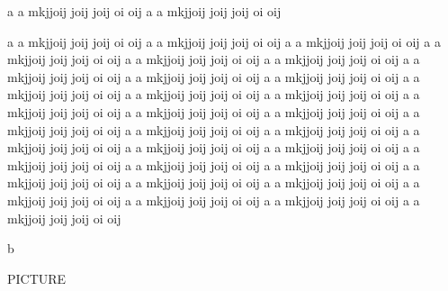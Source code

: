 \documentclass[12pt,twoside,twocolumn,draft,showtrims]{memoir} %
\begin{document}
\newpage
a a mkjjoij  joij joij oi  oij 
a a mkjjoij  joij joij oi  oij 

a a mkjjoij  joij joij oi  oij 
a a mkjjoij  joij joij oi  oij 
a a mkjjoij  joij joij oi  oij 
a a mkjjoij  joij joij oi  oij 
a a mkjjoij  joij joij oi  oij 
a a mkjjoij  joij joij oi  oij 
a a mkjjoij  joij joij oi  oij 
a a mkjjoij  joij joij oi  oij 
a a mkjjoij  joij joij oi  oij 
a a mkjjoij  joij joij oi  oij 
a a mkjjoij  joij joij oi  oij 
a a mkjjoij  joij joij oi  oij 
a a mkjjoij  joij joij oi  oij 
a a mkjjoij  joij joij oi  oij 
a a mkjjoij  joij joij oi  oij 
a a mkjjoij  joij joij oi  oij 
a a mkjjoij  joij joij oi  oij 
a a mkjjoij  joij joij oi  oij 
a a mkjjoij  joij joij oi  oij 
a a mkjjoij  joij joij oi  oij 
a a mkjjoij  joij joij oi  oij 
a a mkjjoij  joij joij oi  oij 
a a mkjjoij  joij joij oi  oij 
a a mkjjoij  joij joij oi  oij 
a a mkjjoij  joij joij oi  oij 
a a mkjjoij  joij joij oi  oij 
a a mkjjoij  joij joij oi  oij 
a a mkjjoij  joij joij oi  oij 
a a mkjjoij  joij joij oi  oij 
a a mkjjoij  joij joij oi  oij 
a a mkjjoij  joij joij oi  oij 


\newpage
b
\newpage

PICTURE
\end{document}
